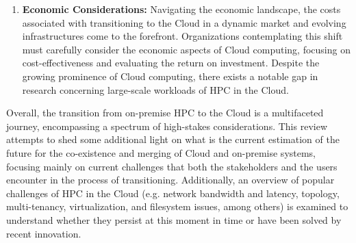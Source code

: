 \begin{enumerate}
\item \textbf{Economic Considerations:} Navigating the economic landscape, the costs associated with transitioning to the Cloud in a dynamic market and evolving infrastructures come to the forefront. Organizations contemplating this shift must carefully consider the economic aspects of Cloud computing, focusing on cost-effectiveness and evaluating the return on investment. Despite the growing prominence of Cloud computing, there exists a notable gap in research concerning large-scale workloads of HPC in the Cloud.
\end{enumerate}

Overall, the transition from on-premise HPC to the Cloud is a multifaceted journey, encompassing a spectrum of high-stakes considerations. This review attempts to shed some additional light on what is the current estimation of the future for the co-existence and merging of Cloud and on-premise systems, focusing mainly on current challenges that both the stakeholders and the users encounter in the process of transitioning. Additionally, an overview of popular challenges of HPC in the Cloud (e.g. network bandwidth and latency, topology, multi-tenancy, virtualization, and filesystem issues, among others) is examined to understand whether they persist at this moment in time or have been solved by recent innovation.


